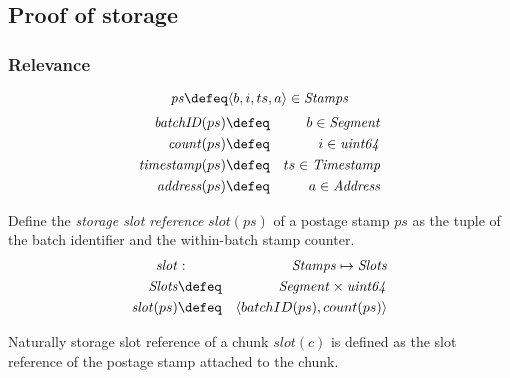 \subsection{Proof of storage \statusgreen}
\subsubsection{Relevance}


\begin{definition}
\label{def:postage-stamp}

\begin{equation}
\mathit{ps} \defeq \langle  b,i,ts,a\rangle\in \mathit{Stamps} 
\end{equation}
\begin{eqnarray}    
\mathit{batchID}(ps) &\defeq& b \in\mathit{Segment}
\\
\mathit{count}(ps) &\defeq &i \in\mathit{uint64}
\\
\mathit{timestamp}(ps)&\defeq &ts \in\mathit{Timestamp}
\\
\mathit{address}(ps) &\defeq &a \in\mathit{Address}
\end{eqnarray}

\end{definition}


\begin{definition}
\label{def:slot}
Define the \emph{storage slot reference} $\mathit{slot}(ps)$ of a postage stamp $ps$ as the tuple of the batch identifier and the within-batch stamp counter.
\begin{eqnarray}
\mathit{slot}&:& \mathit{Stamps}\mapsto\mathit{Slots}\\
\mathit{Slots}&\defeq&\mathit{Segment}\times\mathit{uint64}\\
\mathit{slot}(ps) &\defeq &\langle batchID(ps),count(ps)\rangle 
\end{eqnarray}

Naturally storage slot reference of a chunk $slot(c)$ is defined as the slot reference of the postage stamp attached to the chunk.
\end{definition}


